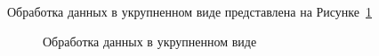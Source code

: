 Обработка данных в укрупненном виде представлена на Рисунке~\cref{fig:bmodel}
\begin{figure}[ht]
    \caption{Обработка данных в укрупненном виде}\label{fig:bmodel}
\end{figure}



